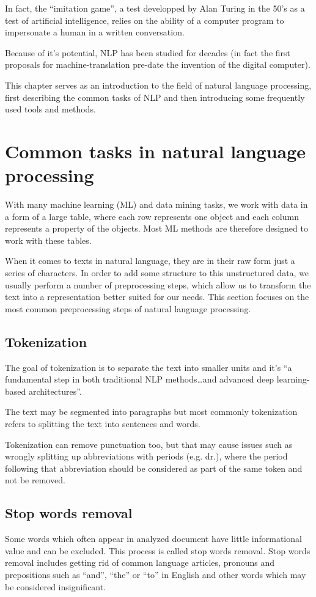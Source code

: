In fact, the ``imitation game'', a test developped by Alan Turing in the 50's as a test of artificial intelligence, relies on the ability of a computer program to impersonate a human in a written conversation.\cite{turing}


Because of it's potential, NLP has been studied for decades (in fact the first proposals for machine-translation pre-date the invention of the digital computer\cite{nlp_history}). 

This chapter serves as an introduction to the field of natural language processing, first describing the common tasks of NLP and then introducing some frequently used tools and methods.
\section{Common tasks in natural language processing}
With many machine learning (ML) and data mining tasks, we work with data in a form of a large table, where each row represents one object and each column represents a property of the objects. Most ML methods are therefore designed to work with these tables. 

When it comes to texts in natural language, they are in their raw form just a series of characters. In order to add some structure to this unstructured data, we usually perform a number of preprocessing steps, which allow us to transform the text into a representation better suited for our needs. This section focuses on the most common preprocessing steps of natural language processing.

\subsection{Tokenization}
The goal of tokenization is to separate the text into smaller units and it's ``a fundamental step in both traditional NLP methods\ldots and advanced deep learning-based architectures''.\cite{tokenization}

The text may be segmented into paragraphs but most commonly tokenization refers to splitting the text into sentences and words. 

Tokenization can remove punctuation too, but that may cause issues such as wrongly splitting up abbreviations with periods (e.g. dr.), where the period following that abbreviation should be considered as part of the same token and not be removed.\cite{nlp_tasks}

\subsection{Stop words removal}
Some words which often appear in analyzed document have little informational value and can be excluded. This process is called stop words removal. Stop words removal includes getting rid of common language articles, pronouns and prepositions such as “and”, “the” or “to” in English and other words which may be considered insignificant.\cite{nlp_tasks}

